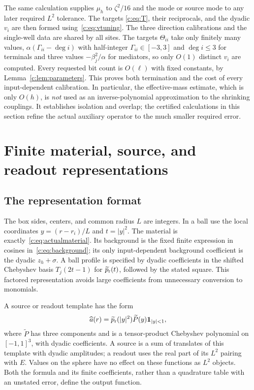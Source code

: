 The same calculation supplies $\mu_h$ to $\zeta^2/16$ and the mode
or source mode to any later required $L^2$ tolerance. The targets
\eqref{c:eq:T}, their reciprocals, and the dyadic $v_i$ are then formed
using~\eqref{c:eq:vtuning}. The three direction calibrations and the
single-well data are shared by all sites. The targets $\Theta_{ii}$ take
only finitely many values, $\alpha(\Gamma_{ii}-\deg i)$ with
half-integer $\Gamma_{ii}\in[-3,3]$ and $\deg i\le3$ for terminals
and three values $-\beta_j^2/\alpha$ for mediators, so only $O(1)$
distinct $v_i$ are computed. Every requested bit count
is $O(\ell)$ with fixed constants, by Lemma~\ref{c:lem:parameters}.
This proves both termination and the cost of every input-dependent
calibration. In particular, the effective-mass estimate, which is only
$O(h)$, is \emph{not} used as an inverse-polynomial approximation to
the shrinking couplings. It establishes isolation and overlap; the
certified calculations in this section refine the actual auxiliary
operator to the much smaller required error.

\section{Finite material, source, and readout representations}
\label{c:sec:representation}

\subsection{The representation format}
The box sides, centers, and common radius $L$ are integers. In a ball
use the local coordinates $y=(r-r_i)/L$ and $t=|y|^2$. The material
is exactly~\eqref{c:eq:actualmaterial}. Its background is the fixed
finite expression in cosines in~\eqref{c:eq:background}; its only
input-dependent background coefficient is the dyadic $z_h+\sigma$.
A ball profile is specified by dyadic coefficients in the shifted
Chebyshev basis $T_j(2t-1)$ for $\widetilde p_{\rm r}(t)$, followed by the stated
square. This factored representation avoids large coefficients from
unnecessary conversion to monomials.

A source or readout template has the form
\begin{equation}
 \widehat a(r)=\widetilde p_{\rm r}(|y|^2)\widetilde P(y)\mathbf 1_{|y|<1},
                                                               \label{c:eq:templateformat}
\end{equation}
where $\widetilde P$ has three components and is a tensor-product Chebyshev
polynomial on $[-1,1]^3$, with dyadic coefficients. A source is a
sum of translates of this template with dyadic amplitudes; a readout
uses the real part of its $L^2$ pairing with $E$. Values on the sphere have
no effect on these functions as $L^2$ objects. Both the formula and
its finite coefficients, rather than a quadrature table with an
unstated error, define the output function.

